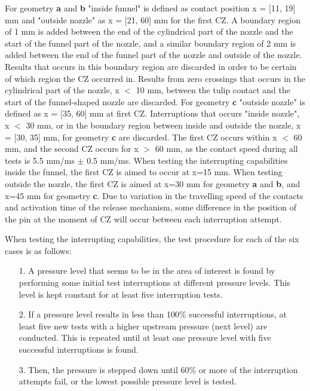 \documentclass[10pt,b5paper,twoside]{article}
\begin{document}
For geometry \textbf{a} and \textbf{b} "inside funnel" is defined as contact position x = [11, 19] mm and "outside nozzle" as x = [21, 60] mm for the first CZ. A boundary region of 1 mm is added between the end of the cylindrical part of the nozzle and the start of the funnel part of the nozzle, and a similar boundary region of 2 mm is added between the end of the funnel part of the nozzle and outside of the nozzle. Results that occurs in this boundary region are discarded in order to be certain of which region the CZ occurred in. Results from zero crossings that occurs in the cylindrical part of the nozzle, x $<$ 10 mm, between the tulip contact and the start of the funnel-shaped nozzle are discarded. For geometry \textbf{c} "outside nozzle" is defined as x = [35, 60] mm at first CZ. Interruptions that occurs "inside nozzle", x $<$ 30 mm, or in the boundary region between inside and outside the nozzle, x = [30, 35] mm, for geometry \textbf{c} are discarded. The first CZ occurs within x $<$ 60 mm, and the second CZ occurs for x $>$ 60 mm, as the contact speed during all tests is 5.5 mm/ms $\pm$ 0.5 mm/ms. When testing the interrupting capabilities inside the funnel, the first CZ is aimed to occur at x=15 mm. When testing outside the nozzle, the first CZ is aimed at x=30 mm for geometry \textbf{a} and \textbf{b}, and x=45 mm for geometry \textbf{c}. Due to variation in the travelling speed of the contacts and activation time of the release mechanism, some difference in the position of the pin at the moment of CZ will occur between each interruption attempt.

When testing the interrupting capabilities, the test procedure for each of the six cases is as follows: 

\begin{itemize}
\item[1.] A pressure level that seems to be in the area of interest is found by performing some initial test interruptions at different pressure levels. This level is kept constant for at least five interruption tests.
\item[2.] If a pressure level results in less than 100\% successful interruptions, at least five new tests with a higher upstream pressure (next level) are conducted. This is repeated until at least one pressure level with five successful interruptions is found.
\item[3.] Then, the pressure is stepped down until 60\% or more of the interruption attempts fail, or the lowest possible pressure level is tested.
\end{itemize}
\end{document}

